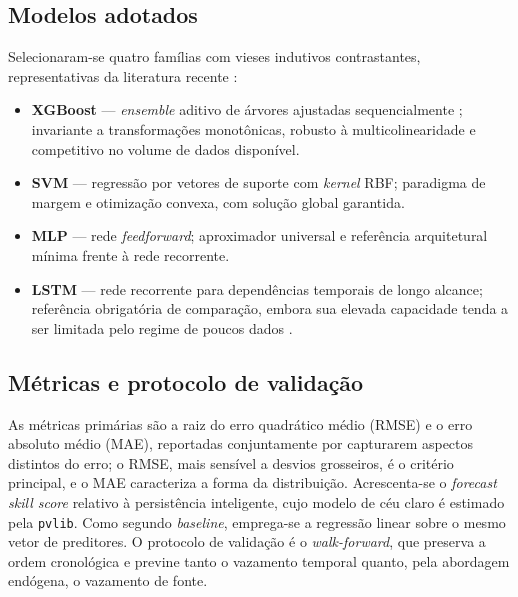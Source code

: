 \subsection{Modelos adotados}

Selecionaram-se quatro famílias com vieses indutivos contrastantes, representativas da literatura recente \citep{tian2023}:

\begin{itemize}[leftmargin=*,itemsep=2pt]
\item \textbf{XGBoost} --- \textit{ensemble} aditivo de árvores ajustadas sequencialmente \citep{chen2016}; invariante a transformações monotônicas, robusto à multicolinearidade e competitivo no volume de dados disponível.
\item \textbf{SVM} --- regressão por vetores de suporte com \textit{kernel} RBF; paradigma de margem e otimização convexa, com solução global garantida.
\item \textbf{MLP} --- rede \textit{feedforward}; aproximador universal e referência arquitetural mínima frente à rede recorrente.
\item \textbf{LSTM} --- rede recorrente para dependências temporais de longo alcance; referência obrigatória de comparação, embora sua elevada capacidade tenda a ser limitada pelo regime de poucos dados \citep{tian2023}.
\end{itemize}

\subsection{Métricas e protocolo de validação}

As métricas primárias são a raiz do erro quadrático médio (RMSE) e o erro absoluto médio (MAE), reportadas conjuntamente por capturarem aspectos distintos do erro; o RMSE, mais sensível a desvios grosseiros, é o critério principal, e o MAE caracteriza a forma da distribuição. Acrescenta-se o \textit{forecast skill score} relativo à persistência inteligente, cujo modelo de céu claro é estimado pela \texttt{pvlib}. Como segundo \textit{baseline}, emprega-se a regressão linear sobre o mesmo vetor de preditores. O protocolo de validação é o \textit{walk-forward}, que preserva a ordem cronológica e previne tanto o vazamento temporal quanto, pela abordagem endógena, o vazamento de fonte.
